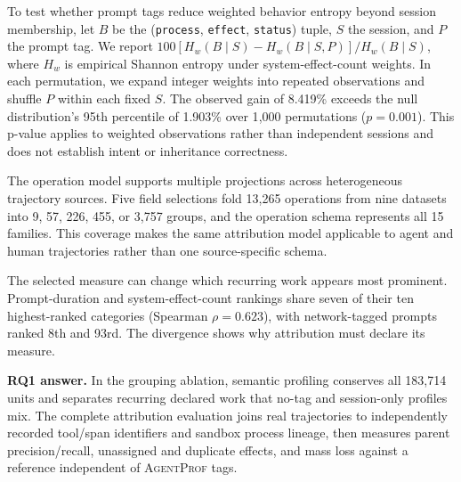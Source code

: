 \documentclass[letterpaper]{article}
\newcommand{\sys}{\textsc{AgentProf}\xspace}
\begin{document}
To test whether prompt tags reduce weighted behavior entropy beyond
session membership, let $B$ be the (\texttt{process}, \texttt{effect},
\texttt{status}) tuple, $S$ the session, and $P$ the prompt tag. We
report $100[H_w(B\mid S)-H_w(B\mid S,P)]/H_w(B\mid S)$, where $H_w$ is
empirical Shannon entropy under system-effect-count weights. In each
permutation, we expand integer weights into repeated observations and
shuffle $P$ within each fixed $S$. The observed gain of 8.419\% exceeds the
null distribution's 95th percentile of 1.903\% over 1{,}000 permutations
($p=0.001$). This p-value applies to weighted
observations rather than independent sessions and does not establish
intent or inheritance correctness.

The operation model supports multiple projections across heterogeneous
trajectory sources. Five field selections fold 13{,}265 operations from nine
datasets into 9, 57, 226, 455, or 3{,}757 groups, and the operation schema
represents all 15 families. This coverage makes the same attribution model
applicable to agent and human trajectories rather than one source-specific
schema.

The selected measure can change which recurring work appears most prominent.
Prompt-duration and system-effect-count rankings share seven of their ten
highest-ranked categories (Spearman $\rho=0.623$), with network-tagged prompts
ranked 8th and 93rd. The divergence shows why attribution must declare its
measure.

\textbf{RQ1 answer.} In the grouping ablation, semantic profiling conserves all
183{,}714 units and separates recurring declared work that no-tag and
session-only profiles mix.
The complete attribution evaluation joins real trajectories to
independently recorded tool/span identifiers and sandbox process
lineage, then measures parent precision/recall, unassigned and duplicate
effects, and mass loss against a reference independent of \sys{} tags.
\end{document}
